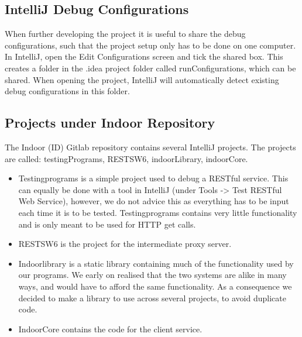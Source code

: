 \subsection*{IntelliJ Debug Configurations}
When further developing the project it is useful to share the debug configurations, such that the project setup only has to be done on one computer. In IntelliJ, open the Edit Configurations screen and tick the shared box. This creates a folder in the .idea project folder called runConfigurations, which can be shared. When opening the project, IntelliJ will automatically detect existing debug configurations in this folder.

\subsection*{Projects under Indoor Repository}
The Indoor (ID) Gitlab repository contains several IntelliJ projects. The projects are called: testingPrograms, RESTSW6, indoorLibrary, indoorCore.

\begin{itemize}
\item Testingprograms is a simple project used to debug a RESTful service. This can equally be done with a tool in IntelliJ (under Tools -> Test RESTful Web Service), however, we do not advice this as everything has to be input each time it is to be tested. Testingprograms contains very little functionality and is only meant to be used for HTTP get calls.
\item RESTSW6 is the project for the intermediate proxy server. 
\item Indoorlibrary is a static library containing much of the functionality used by our programs. We early on realised that the two systems are alike in many ways, and would have to afford the same functionality. As a consequence we decided to make a library to use across several projects, to avoid duplicate code. 
\item IndoorCore contains the code for the client service. 
\end{itemize} 

